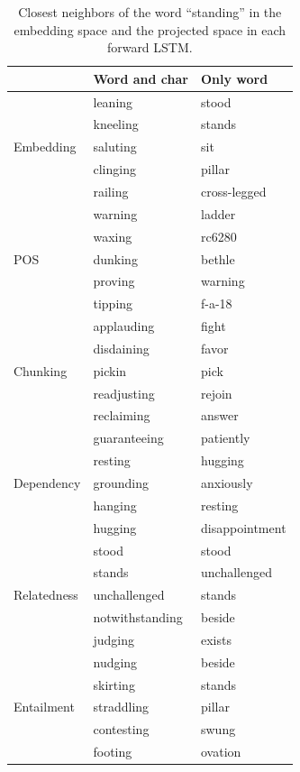 \documentclass[11pt,a4paper]{article}
\begin{document}
\begin{table}[t]
  \begin{center}
	\begin{tabular}{l|l|l}
 			   & Word and char & Only word \\ \hline
    		   & leaning  & stood \\
        	   & kneeling & stands \\
    Embedding  & saluting & sit \\
    		   & clinging & pillar \\
    		   & railing  & cross-legged \\ \hline

			   & warning  & ladder \\
               & waxing   & rc6280 \\
    POS        & dunking  & bethle \\
    		   & proving  & warning \\
               & tipping  & f-a-18 \\ \hline

			   & applauding  & fight \\
               & disdaining  & favor \\
    Chunking   & pickin      & pick \\
    		   & readjusting & rejoin \\
               & reclaiming  & answer \\ \hline

			   & guaranteeing & patiently \\
               & resting      & hugging \\
	Dependency & grounding    & anxiously \\
               & hanging      & resting \\
               & hugging      & disappointment \\ \hline

							& stood           & stood \\
                            & stands          & unchallenged \\
	Relatedness			    & unchallenged    & stands \\
    						& notwithstanding & beside \\
                            & judging         & exists \\ \hline

							& nudging    & beside \\
                            & skirting   & stands \\
	Entailment			    & straddling & pillar \\
    						& contesting & swung \\
                            & footing    & ovation \\ \hline
  \end{tabular}
    \caption{Closest neighbors of the word ``standing'' in the embedding space and the projected space in each forward LSTM.}
    \label{tb:knn}
  \end{center}
\end{table}
\end{document}
